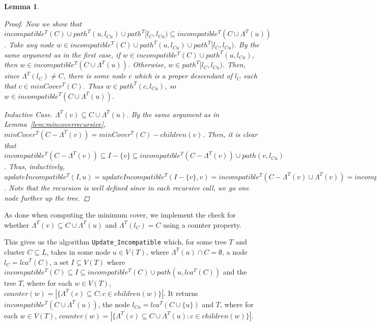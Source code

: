 \documentclass{article}
\newcommand{\leafset}{\Lambda}
\newtheorem{incompatibilityrecursive}[incompatibility]{Lemma}
\begin{document}
\begin{incompatibilityrecursive}
\begin{proof}
            Now we show that $incompatible^{T}(C) \cup path^{T}(u, l_{Cu}) \cup path^{T}[l_C, l_{Cu}) \subseteq incompatible^{T}(C \cup \leafset^{T}(u))$. Take any node $w \in incompatible^{T}(C) \cup path^{T}(u, l_{Cu}) \cup path^{T}[l_C, l_{Cu})$. By the same argument as in the first case, if $w \in incompatible^{T}(C) \cup path^{T}(u, l_{Cu})$, then $w \in incompatible^{T}(C \cup \leafset^{T}(u))$. Otherwise, $w \in path^{T}[l_C, l_{Cu})$. Then, since $\leafset^{T}(l_C) \neq C$, there is some node $c$ which is a proper descendant of $l_C$ such that $c \in minCover^T(C)$. Thus $w \in path^{T}(c, l_{Cu})$, so $w \in incompatible^{T}(C \cup \leafset^{T}(u))$.

            \textit{Inductive Case.} $\leafset^{T}(v) \subseteq C \cup \leafset^{T}(u)$. By the same argument as in Lemma~\ref{lem:mincoverrecursive}, $minCover^{T}(C - \leafset^{T}(v)) = minCover^{T}(C) - children(v)$. Then, it is clear that $incompatible^{T}(C - \leafset^{T}(v)) \subseteq I - \{v\} \subseteq incompatible^{T}(C - \leafset^{T}(v)) \cup path(v, l_{Cu})$. Thus, inductively, $updateIncompatible^{T}(I, u) = updateIncompatible^{T}(I - \{v\}, v) = incompatible^{T}(C - \leafset^{T}(v) \cup \leafset^{T}(v)) = incompatible^{T}(C \cup \leafset^{T}(u))$. Note that the recursion is well defined since in each recursive call, we go one node further up the tree.
        \end{proof}
    \end{incompatibilityrecursive}

    As done when computing the minimum cover, we implement the check for whether $\leafset^{T}(v) \subseteq C \cup \leafset^{T}(u)$ and $\leafset^{T}(l_C) = C$ using a counter property.

    This gives us the algorithm \texttt{Update\_Incompatible} which, for some tree $T$ and cluster $C \subseteq L$, takes in some node $u \in V(T)$, where $\leafset^{T}(u) \cap C = \emptyset$, a node $l_C = lca^{T}(C)$, a set $I \subseteq V(T)$ where $incompatible^{T}(C) \subseteq I \subseteq incompatible^{T}(C) \cup path(u, lca^T(C))$ and the tree $T$, where for each $w \in V(T)$, $counter(w) = |\{\leafset^{T}(c) \subseteq C : c \in children(w)\}|$. It returns $incompatible^{T}(C \cup \leafset^{T}(u))$, the node $l_{Cu} = lca^{T}(C \cup \{u\})$ and $T$, where for each $w \in V(T)$, $counter(w) = |\{\leafset^{T}(c) \subseteq C \cup \leafset^{T}(u) : c \in children(w)\}|$.
\end{document}
